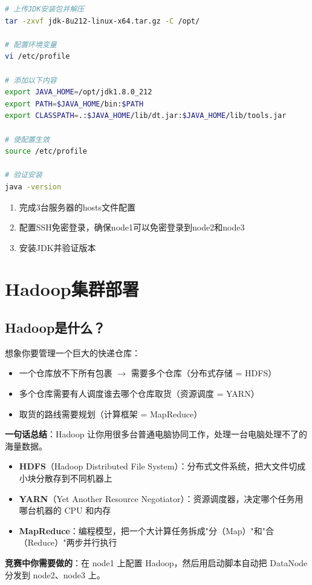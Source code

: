 \documentclass[12pt,a4paper]{article}
\begin{document}
\begin{lstlisting}[language=bash]
# 上传JDK安装包并解压
tar -zxvf jdk-8u212-linux-x64.tar.gz -C /opt/

# 配置环境变量
vi /etc/profile

# 添加以下内容
export JAVA_HOME=/opt/jdk1.8.0_212
export PATH=$JAVA_HOME/bin:$PATH
export CLASSPATH=.:$JAVA_HOME/lib/dt.jar:$JAVA_HOME/lib/tools.jar

# 使配置生效
source /etc/profile

# 验证安装
java -version
\end{lstlisting}

\begin{practicebox}[动手练习]
\begin{enumerate}
    \item 完成3台服务器的hosts文件配置
    \item 配置SSH免密登录，确保node1可以免密登录到node2和node3
    \item 安装JDK并验证版本
\end{enumerate}
\end{practicebox}

\section{Hadoop集群部署}

\subsection{Hadoop是什么？}

\begin{theorybox}
想象你要管理一个巨大的快递仓库：
\begin{itemize}
    \item 一个仓库放不下所有包裹 $\rightarrow$ 需要多个仓库（分布式存储 = HDFS）
    \item 多个仓库需要有人调度谁去哪个仓库取货（资源调度 = YARN）
    \item 取货的路线需要规划（计算框架 = MapReduce）
\end{itemize}

\textbf{一句话总结}：Hadoop 让你用很多台普通电脑协同工作，处理一台电脑处理不了的海量数据。
\end{theorybox}

\begin{knowledgebox}
\begin{itemize}
    \item \textbf{HDFS}（Hadoop Distributed File System）：分布式文件系统，把大文件切成小块分散存到不同机器上
    \item \textbf{YARN}（Yet Another Resource Negotiator）：资源调度器，决定哪个任务用哪台机器的 CPU 和内存
    \item \textbf{MapReduce}：编程模型，把一个大计算任务拆成"分（Map）"和"合（Reduce）"两步并行执行
\end{itemize}

\textbf{竞赛中你需要做的}：在 node1 上配置 Hadoop，然后用启动脚本自动把 DataNode 分发到 node2、node3 上。
\end{knowledgebox}
\end{document}
